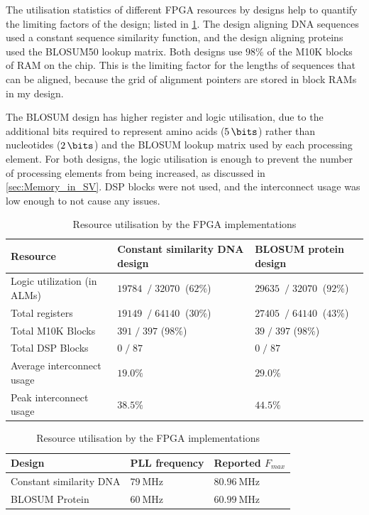 The utilisation statistics of different FPGA resources by designs help to quantify the limiting factors of the design; listed in \cref{tab:FPGA_Utilisation}.
The design aligning DNA sequences used a constant sequence similarity function, and the design aligning proteins used the BLOSUM50 lookup matrix.
Both designs use $98\%$ of the M10K blocks of RAM on the chip.
This is the limiting factor for the lengths of sequences that can be aligned, because the grid of alignment pointers are stored in block RAMs in my design.

The BLOSUM design has higher register and logic utilisation, due to the additional bits required to represent amino acids ($\SI{5}{\bits}$) rather than nucleotides ($\SI{2}{\bits}$) and the BLOSUM lookup matrix used by each processing element.
For both designs, the logic utilisation is enough to prevent the number of processing elements from being increased, as discussed in \cref{sec:Memory_in_SV}.
DSP blocks were not used, and the interconnect usage was low enough to not cause any issues.

\begin{table}
    \centering
    \begin{tabular}{|p{}|p{}p{}|} \hline
        Resource & Constant similarity DNA design & BLOSUM protein design \\ \hline
        Logic utilization (in ALMs) & $\SI{19784}{} \;/\; \SI{32070}{}$ ($62\%$) & $\SI{29635}{} \;/\; \SI{32070}{}$ ($92\%$) \\
        Total registers & $\SI{19149}{} \;/\; \SI{64140}{}$ ($30\%$) & $\SI{27405}{} \;/\; \SI{64140}{}$ ($43\%$) \\
        Total M10K Blocks & $391 \;/\; 397$ ($98\%$) & $39 \;/\; 397$ ($98\%$) \\
        Total DSP Blocks & $0 \;/\; 87$ & $0 \;/\; 87$ \\
        Average interconnect usage & $19.0\%$ & $29.0\%$ \\
        Peak interconnect usage & $38.5 \%$ & $44.5\%$ \\ \hline
    \end{tabular}
    \caption{Resource utilisation by the FPGA implementations}
    \label{tab:FPGA_Utilisation}
\end{table}

\begin{table}
    \centering
    \begin{tabular}{|l|ll|} \hline
        Design & PLL frequency  & Reported $F_{max}$ \\ \hline
        Constant similarity DNA & $\SI{79}{\mega\hertz}$ & $\SI{80.96}{\mega\hertz}$ \\
        BLOSUM Protein & $\SI{60}{\mega\hertz}$ & $\SI{60.99}{\mega\hertz}$ \\ \hline
    \end{tabular}
    \caption{Resource utilisation by the FPGA implementations}
    \label{tab:FPGA_Clocks}
\end{table}

